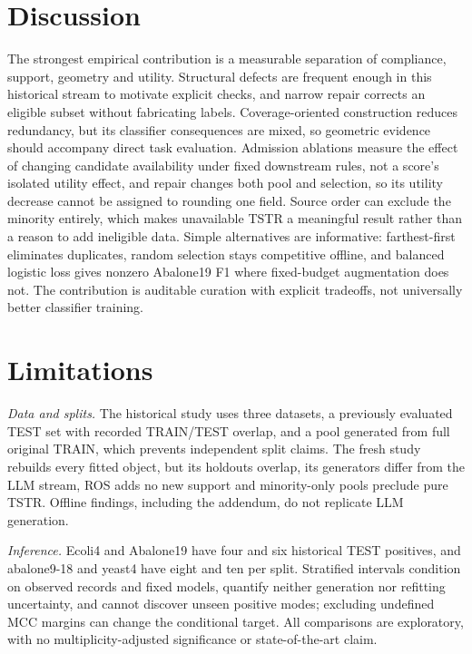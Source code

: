 \section{Discussion}
The strongest empirical contribution is a measurable separation of compliance, support, geometry and utility. Structural defects are frequent enough in this historical stream to motivate explicit checks, and narrow repair corrects an eligible subset without fabricating labels. Coverage-oriented construction reduces redundancy, but its classifier consequences are mixed, so geometric evidence should accompany direct task evaluation. Admission ablations measure the effect of changing candidate availability under fixed downstream rules, not a score's isolated utility effect, and repair changes both pool and selection, so its utility decrease cannot be assigned to rounding one field. Source order can exclude the minority entirely, which makes unavailable TSTR a meaningful result rather than a reason to add ineligible data. Simple alternatives are informative: farthest-first eliminates duplicates, random selection stays competitive offline, and balanced logistic loss gives nonzero Abalone19 F1 where fixed-budget augmentation does not. The contribution is auditable curation with explicit tradeoffs, not universally better classifier training.

\section{Limitations}\label{sec:limitations}
\textit{Data and splits.} The historical study uses three datasets, a previously evaluated TEST set with recorded TRAIN/TEST overlap, and a pool generated from full original TRAIN, which prevents independent split claims. The fresh study rebuilds every fitted object, but its holdouts overlap, its generators differ from the LLM stream, ROS adds no new support and minority-only pools preclude pure TSTR. Offline findings, including the addendum, do not replicate LLM generation.

\textit{Inference.} Ecoli4 and Abalone19 have four and six historical TEST positives, and abalone9-18 and yeast4 have eight and ten per split. Stratified intervals condition on observed records and fixed models, quantify neither generation nor refitting uncertainty, and cannot discover unseen positive modes; excluding undefined MCC margins can change the conditional target. All comparisons are exploratory, with no multiplicity-adjusted significance or state-of-the-art claim.

